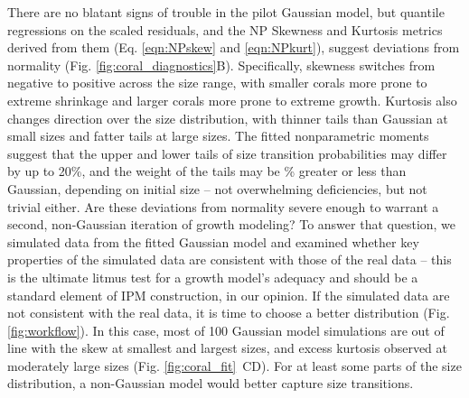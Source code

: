\documentclass[12pt]{article}
\begin{document}
There are no blatant signs of trouble in the pilot Gaussian model, but quantile regressions on the scaled residuals, and the NP Skewness and Kurtosis metrics derived from them (Eq. \ref{eqn:NPskew} and \ref{eqn:NPkurt}), suggest deviations from normality (Fig. \ref{fig:coral_diagnostics}B).
Specifically, skewness switches from negative to positive across the size range, with smaller corals more prone to extreme shrinkage and larger corals more prone to extreme growth.  
Kurtosis also changes direction over the size distribution, with thinner tails than Gaussian at small sizes and fatter tails at large sizes. 
The fitted nonparametric moments suggest that the upper and lower tails of size transition probabilities may differ by up to 20\%, and the weight of the tails may be \% greater or less than Gaussian, depending on initial size -- not overwhelming deficiencies, but not trivial either. 
Are these deviations from normality severe enough to warrant a second, non-Gaussian iteration of growth modeling? 
To answer that question, we simulated data from the fitted Gaussian model and examined whether key properties of the simulated data are consistent with those of the real data -- this is the ultimate litmus test for a growth model's adequacy and should be a standard element of IPM construction, in our opinion.
If the simulated data are not consistent with the real data, it is time to choose a better distribution (Fig. \ref{fig:workflow}). 
In this case, most of 100 Gaussian model simulations are out of line with the skew at smallest and largest sizes, and excess kurtosis observed at moderately large sizes (Fig. \ref{fig:coral_fit}~CD). For at least some parts of the size distribution, a non-Gaussian model would better capture size transitions. 
\end{document}
